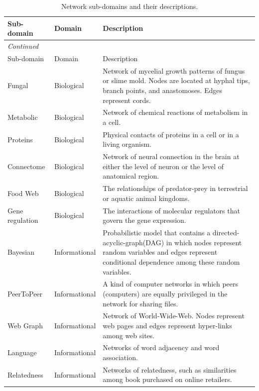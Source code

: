 \documentclass{article}
\begin{document}
\newpage
	\begin{longtable}{| l | l | p{9cm} |}
	\caption{Network sub-domains and their descriptions.} \label{tab:subdomain}\\
	
	\hline
 	Sub-domain & Domain& Description \\ \hline \hline
	 \endfirsthead
	 \multicolumn{3}{l}{\small\it Continued}\\ \hline
	 Sub-domain & Domain& Description \\ \hline \hline
 	\endhead
      Fungal &  Biological & Network of mycelial growth patterns of fungus or slime mold. Nodes are located at hyphal tips, branch points, and anastomoses. Edges represent cords.\\  \hline
      Metabolic &  Biological & Network of chemical reactions of metabolism in a cell.\\  \hline
      Proteins &  Biological & Physical contacts of proteins in a cell or in a living organism.\\  \hline
      Connectome &  Biological & Network of neural connection in the brain at either the level of neuron or the level of anatomical region.\\  \hline
      Food Web &  Biological & The relationships of predator-prey in terrestrial or aquatic animal kingdoms.\\  \hline
      Gene regulation &  Biological & The interactions of molecular regulators that govern the gene expression.\\  \hline
      Bayesian & Informational & Probabilistic model that contains a directed-acyclic-graph(DAG) in which nodes represent random variables and edges represent conditional dependence among these random variables.\\  \hline
      PeerToPeer &  Informational & A kind of computer networks in which peers (computers) are equally privileged in the network for sharing files.\\  \hline
      Web Graph &  Informational & Network of World-Wide-Web. Nodes represent web pages and edges represent hyper-links among web sites. \\  \hline
      Language &  Informational & Networks of word adjacency and word association.\\  \hline
      Relatedness &  Informational & Networks of relatedness, such as similarities among book purchased on online retailers. \\  \hline

\end{longtable}
\end{document}
